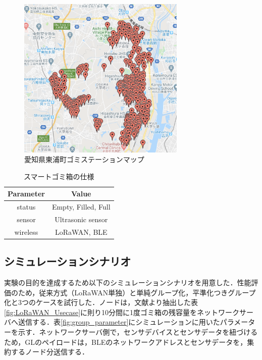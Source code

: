 \documentclass[Japanese]{dicomopapers}
\begin{document}
\begin{figure}[h]
    \centering
    \includegraphics[width=8cm]{img/garbage_station.png}
    \caption{愛知県東浦町ゴミステーションマップ}
    \label{garbage_station_map}
\end{figure}

\begin{table}[h]
    \centering
    \caption{スマートゴミ箱の仕様}\label{tab:smart_garbage_spec}
    \begin{tabular}{|c|c|}
    \hline
    \textbf{Parameter} & \textbf{Value} \\ \hline
    status   & Empty, Filled, Full   \\ \hline
    sensor   & Ultrasonic sensor     \\ \hline
    wireless & LoRaWAN, BLE          \\ \hline
    \end{tabular}
\end{table}

\subsection{シミュレーションシナリオ}
実験の目的を達成するため以下のシミュレーションシナリオを用意した．性能評価のため，従来方式（LoRaWAN単独）と単純グループ化，平準化つきグループ化と3つのケースを試行した．ノードは，文献\cite{lorawan_usecase}より抽出した表\ref{fig:LoRaWAN_Usecase}に則り10分間に1度ゴミ箱の残容量をネットワークサーバへ送信する．表\ref{fig:group_parameter}にシミュレーションに用いたパラメーターを示す．ネットワークサーバ側で，センサデバイスとセンサデータを紐づけるため，GLのペイロードは，BLEのネットワークアドレスとセンサデータを，集約するノード分送信する．
\end{document}
